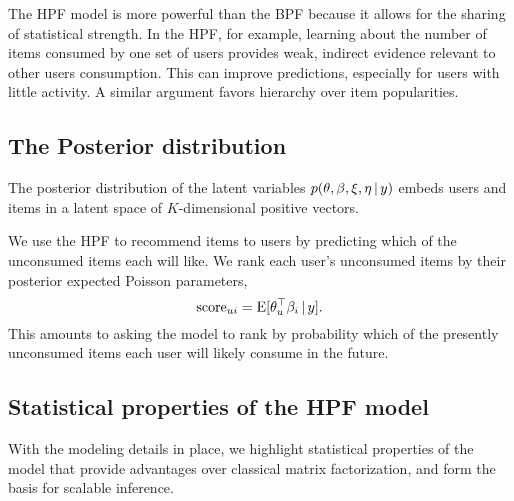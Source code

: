 The HPF model is more powerful than the BPF because it allows for the
sharing of statistical strength. In the HPF, for example, learning
about the number of items consumed by one set of users provides weak,
indirect evidence relevant to other users consumption. This can
improve predictions, especially for users with little activity. A
similar argument favors hierarchy over item popularities.

\subsection{The Posterior distribution}
The posterior distribution of the latent variables $p(\theta, \beta,
\xi, \eta \,\vert\, y)$ embeds users and items in a latent space of
$K$-dimensional positive vectors. 

We use the HPF to recommend items to users by predicting which of the
unconsumed items each will like.  We rank each user's unconsumed items
by their posterior expected Poisson parameters,
\begin{equation}
  \label{eq:score}
  \textrm{score}_{ui} = \textrm{E}[\theta_u^\top \beta_i \,\vert\, y].
\end{equation}
This amounts to asking the model to rank by probability which of the
presently unconsumed items each user will likely consume in the
future.

\subsection{Statistical properties of the HPF model}
With the modeling details in place, we highlight statistical
properties of the model that provide advantages over classical matrix
factorization, and form the basis for scalable inference.

